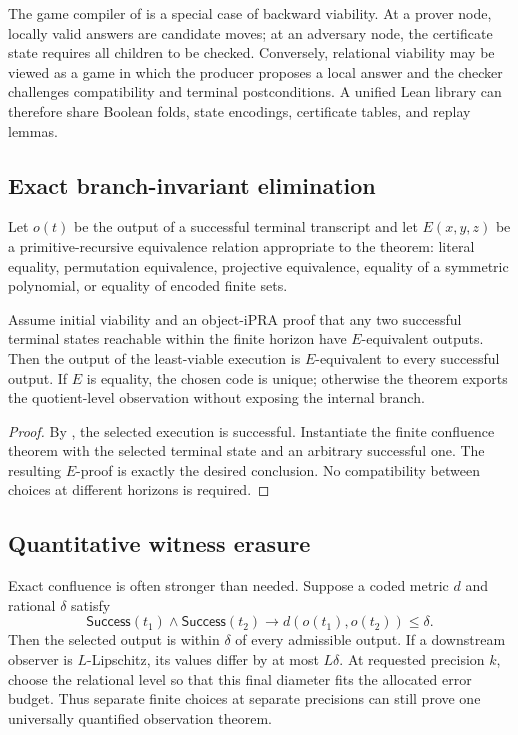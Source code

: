 The game compiler of  is a special case of backward viability.  At a prover node, locally valid answers are candidate moves; at an adversary node, the certificate state requires all children to be checked.  Conversely, relational viability may be viewed as a game in which the producer proposes a local answer and the checker challenges compatibility and terminal postconditions.  A unified Lean library can therefore share Boolean folds, state encodings, certificate tables, and replay lemmas.

\subsection{Exact branch-invariant elimination}

Let \(o(t)\) be the output of a successful terminal transcript and let \(E(x,y,z)\) be a primitive-recursive equivalence relation appropriate to the theorem: literal equality, permutation equivalence, projective equivalence, equality of a symmetric polynomial, or equality of encoded finite sets.

\begin{theorem}\label{thm:stable-quotient}
Assume initial viability and an object-iPRA proof that any two successful terminal states reachable within the finite horizon have \(E\)-equivalent outputs.  Then the output of the least-viable execution is \(E\)-equivalent to every successful output.  If \(E\) is equality, the chosen code is unique; otherwise the theorem exports the quotient-level observation without exposing the internal branch.
\end{theorem}

\begin{proof}
By , the selected execution is successful.  Instantiate the finite confluence theorem with the selected terminal state and an arbitrary successful one.  The resulting \(E\)-proof is exactly the desired conclusion.  No compatibility between choices at different horizons is required.
\end{proof}

\subsection{Quantitative witness erasure}

Exact confluence is often stronger than needed.  Suppose a coded metric \(d\) and rational \(\delta\) satisfy
\[
 \mathsf{Success}(t_1)\wedge \mathsf{Success}(t_2)
 \longrightarrow d(o(t_1),o(t_2))\leq\delta.
\]
Then the selected output is within \(\delta\) of every admissible output.  If a downstream observer is \(L\)-Lipschitz, its values differ by at most \(L\delta\).  At requested precision \(k\), choose the relational level so that this final diameter fits the allocated error budget.  Thus separate finite choices at separate precisions can still prove one universally quantified observation theorem.

